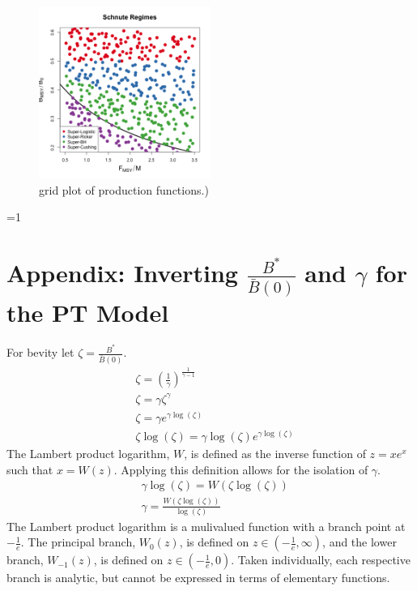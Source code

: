 \documentclass[12pt]{article}
\newcounter{alphasect}
\def\alphainsection{0}
\let\oldsection=\section
\def\section{%
  \ifnum\alphainsection=1%
    \addtocounter{alphasect}{1}
  \fi%
\oldsection}%
\begin{document}
%
\begin{figure}[h!]
\includegraphics[width=0.5\textwidth]{../gpBias/designLineColorHHardFlatT30N150WWideN112.png}
\caption{\color{red} grid plot of production functions.)}
\end{figure}

%
\clearpage

%
\section{Appendix\label{lambApp}: Inverting $\frac{B^*}{\bar B(0)}$ and $\gamma$ for the PT Model}
For bevity let $\zeta=\frac{B^*}{\bar B(0)}$.
\begin{align*}
&\zeta=\left(\frac{1}{\gamma}\right)^{\frac{1}{\gamma-1}}\\
&\zeta=\gamma\zeta^{\gamma}\\
&\zeta=\gamma e^{\gamma\log(\zeta)}\\
&\zeta\log(\zeta)=\gamma\log(\zeta) e^{\gamma\log(\zeta)}
\end{align*}
The Lambert product logarithm, $W$, is defined as the inverse function of $z=xe^x$ such that $x=W(z)$. 
Applying this definition allows for the isolation of $\gamma$.
\begin{align}
&\gamma\log(\zeta)=W\left(\zeta\log(\zeta)\right) \nonumber\\
&\gamma=\frac{W\left(\zeta\log(\zeta)\right)}{\log(\zeta)} \label{gammaOfZeta}
\end{align}
The Lambert product logarithm is a mulivalued function with a branch point at 
$-\frac{1}{e}$. The principal branch, $W_0(z)$, is defined on $z\in\left(-\frac{1}{e}, \infty\right)$, 
and the lower branch, $W_{-1}(z)$, is defined on $z\in\left(-\frac{1}{e}, 0\right)$. Taken 
individually, each respective branch is analytic, but cannot be expressed in terms 
of elementary functions.
\end{document}

